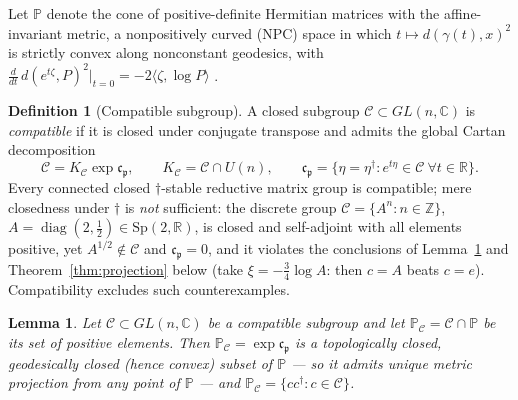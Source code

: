\documentclass[11pt]{article}
\newtheorem{lemma}[theorem]{Lemma}
\theoremstyle{definition}
\newtheorem{definition}[theorem]{Definition}
\theoremstyle{remark}
\newcommand{\C}{\mathbb{C}}
\newcommand{\R}{\mathbb{R}}
\newcommand{\Z}{\mathbb{Z}}
\newcommand{\Sp}{\mathrm{Sp}}
\newcommand{\dg}{\dagger}
\begin{document}
Let $\mathbb P$ denote the cone of positive-definite Hermitian matrices with
the affine-invariant metric, a nonpositively curved (NPC) space in which
$t\mapsto d(\gamma(t),x)^2$ is strictly convex along nonconstant geodesics,
with $\frac{d}{dt}\,d(e^{t\zeta},P)^2\big|_{t=0}=-2\langle\zeta,\log
P\rangle$ \cite{Bhatia2007,BridsonHaefliger}.

\begin{definition}[Compatible subgroup]\label{def:compatible}
A closed subgroup $\mathcal C\subset GL(n,\C)$ is \emph{compatible} if it
is closed under conjugate transpose and admits the global Cartan
decomposition
\begin{equation}
\mathcal C=K_{\mathcal C}\exp\mathfrak c_{\mathfrak p},
\qquad
K_{\mathcal C}=\mathcal C\cap U(n),
\qquad
\mathfrak c_{\mathfrak p}
=\{\eta=\eta^{\dg}:e^{t\eta}\in\mathcal C\ \forall t\in\R\}.
\end{equation}
Every connected closed $\dg$-stable reductive matrix group is compatible;
mere closedness under $\dg$ is \emph{not} sufficient: the discrete group
$\mathcal C=\{A^n:n\in\Z\}$, $A=\operatorname{diag}(2,\tfrac12)
\in\Sp(2,\R)$, is closed and self-adjoint with all elements positive, yet
$A^{1/2}\notin\mathcal C$ and $\mathfrak c_{\mathfrak p}=0$, and it
violates the conclusions of Lemma~\ref{lem:totgeo} and
Theorem~\ref{thm:projection} below (take $\xi=-\tfrac34\log A$: then $c=A$
beats $c=e$).  Compatibility excludes such counterexamples.
\end{definition}

\begin{lemma}\label{lem:totgeo}
Let $\mathcal C\subset GL(n,\C)$ be a compatible subgroup and let
$\mathbb P_{\mathcal C}=\mathcal C\cap\mathbb P$ be its set of
positive elements.  Then
$\mathbb P_{\mathcal C}=\exp\mathfrak c_{\mathfrak p}$ is a topologically
closed, geodesically closed (hence convex) subset of $\mathbb P$ --- so it
admits unique metric projection from any point of $\mathbb P$ --- and
$\mathbb P_{\mathcal C}=\{cc^{\dg}:c\in\mathcal C\}$.
\end{lemma}
\end{document}
